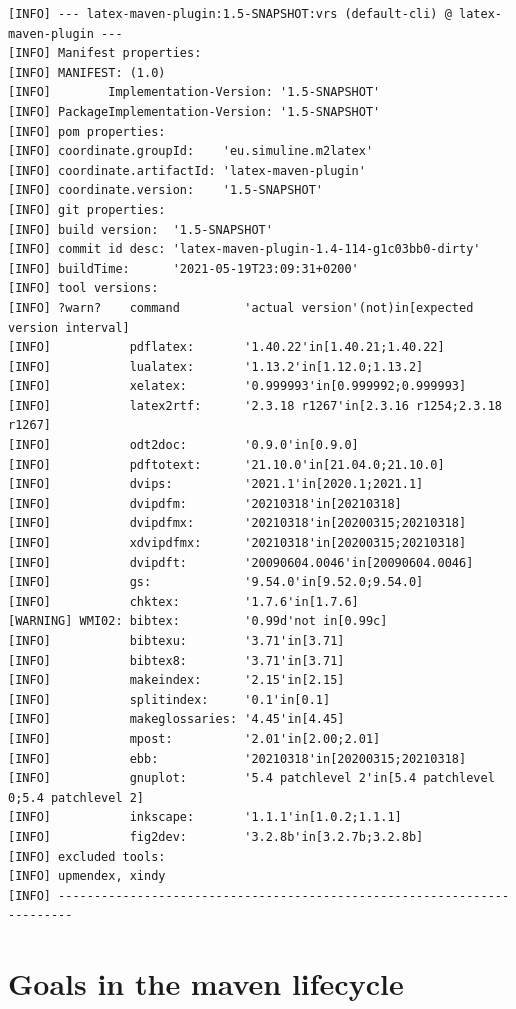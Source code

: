 \documentclass[12pt]{book}
\begin{document}
\begin{lstlisting}[basicstyle=\tiny,
float, captionpos=b, label={lst:vrsOut}, 
caption={Output of goal \texttt{latex:vrs}}]
[INFO] --- latex-maven-plugin:1.5-SNAPSHOT:vrs (default-cli) @ latex-maven-plugin ---
[INFO] Manifest properties: 
[INFO] MANIFEST: (1.0)
[INFO]        Implementation-Version: '1.5-SNAPSHOT'
[INFO] PackageImplementation-Version: '1.5-SNAPSHOT'
[INFO] pom properties:
[INFO] coordinate.groupId:    'eu.simuline.m2latex'
[INFO] coordinate.artifactId: 'latex-maven-plugin'
[INFO] coordinate.version:    '1.5-SNAPSHOT'
[INFO] git properties: 
[INFO] build version:  '1.5-SNAPSHOT'
[INFO] commit id desc: 'latex-maven-plugin-1.4-114-g1c03bb0-dirty'
[INFO] buildTime:      '2021-05-19T23:09:31+0200'
[INFO] tool versions: 
[INFO] ?warn?    command         'actual version'(not)in[expected version interval]
[INFO]           pdflatex:       '1.40.22'in[1.40.21;1.40.22]
[INFO]           lualatex:       '1.13.2'in[1.12.0;1.13.2]
[INFO]           xelatex:        '0.999993'in[0.999992;0.999993]
[INFO]           latex2rtf:      '2.3.18 r1267'in[2.3.16 r1254;2.3.18 r1267]
[INFO]           odt2doc:        '0.9.0'in[0.9.0]
[INFO]           pdftotext:      '21.10.0'in[21.04.0;21.10.0]
[INFO]           dvips:          '2021.1'in[2020.1;2021.1]
[INFO]           dvipdfm:        '20210318'in[20210318]
[INFO]           dvipdfmx:       '20210318'in[20200315;20210318]
[INFO]           xdvipdfmx:      '20210318'in[20200315;20210318]
[INFO]           dvipdft:        '20090604.0046'in[20090604.0046]
[INFO]           gs:             '9.54.0'in[9.52.0;9.54.0]
[INFO]           chktex:         '1.7.6'in[1.7.6]
[WARNING] WMI02: bibtex:         '0.99d'not in[0.99c]
[INFO]           bibtexu:        '3.71'in[3.71]
[INFO]           bibtex8:        '3.71'in[3.71]
[INFO]           makeindex:      '2.15'in[2.15]
[INFO]           splitindex:     '0.1'in[0.1]
[INFO]           makeglossaries: '4.45'in[4.45]
[INFO]           mpost:          '2.01'in[2.00;2.01]
[INFO]           ebb:            '20210318'in[20200315;20210318]
[INFO]           gnuplot:        '5.4 patchlevel 2'in[5.4 patchlevel 0;5.4 patchlevel 2]
[INFO]           inkscape:       '1.1.1'in[1.0.2;1.1.1]
[INFO]           fig2dev:        '3.2.8b'in[3.2.7b;3.2.8b]
[INFO] excluded tools: 
[INFO] upmendex, xindy
[INFO] ------------------------------------------------------------------------
\end{lstlisting}


\section{Goals in the maven lifecycle}\label{sec:usageLifecycle}
\end{document}
